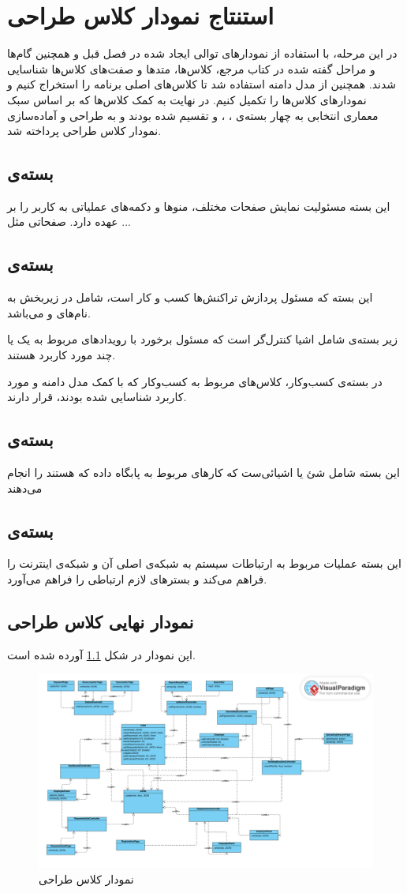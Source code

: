 \chapter{استنتاج نمودار کلاس طراحی}
در این مرحله، با استفاده از نمودار‌های توالی ایجاد شده در فصل قبل و همچنین گام‌ها و مراحل گفته شده در کتاب مرجع، کلاس‌ها، متد‌ها و صفت‌های کلاس‌ها شناسایی شدند. همچنین از مدل دامنه استفاده شد تا کلاس‌های اصلی برنامه را استخراج کنیم و نمودار‌‌های کلاس‌ها را تکمیل کنیم. در نهایت به کمک کلاس‌ها که بر اساس سبک معماری انتخابی به چهار بسته‌ی 
،
،
 و 
تقسیم شده بودند و به طراحی و آماده‌سازی نمودار کلاس طراحی پرداخته شد.

\section{بسته‌ی \frontend}
این بسته مسئولیت نمایش صفحات مختلف، منو‌ها و دکمه‌های عملیاتی به کاربر را بر عهده دارد. صفحاتی مثل ...

\section{بسته‌ی }
این بسته که مسئول پردازش تراکنش‌ها کسب و کار است، شامل در زیربخش به نام‌های   و  می‌باشد.

زیر بسته‌ی  شامل اشیا کنترل‌گر است که مسئول برخورد با رویداد‌های مربوط به یک یا چند مورد کاربرد هستند. 

در بسته‌ی کسب‌وکار،‌ کلاس‌های مربوط به کسب‌وکار که با کمک مدل دامنه و مورد کاربرد شناسایی شده بودند، قرار دارند.
\section{بسته‌ی }
این بسته شامل شئ یا اشیا‌‌ئی‌ست که کار‌های مربوط به پابگاه داده که  هستند را انجام می‌دهند 
\section{بسته‌ی }
این بسته عملیات مربوط به ارتباطات سیستم به شبکه‌ی اصلی آن و شبکه‌ی اینترنت را فراهم می‌کند و بستر‌های لازم ارتباطی را فراهم می‌آورد.
\section{نمودار نهایی کلاس طراحی}
این نمودار در شکل \ref{pic:cd} آورده شده است.
\begin{figure}
	\begin{center}
		\includegraphics[width=\textwidth, angle=90, height=\textheight]{./images/cd}
	\end{center}
\caption{نمودار کلاس طراحی}
\label{pic:cd}
\end{figure}
